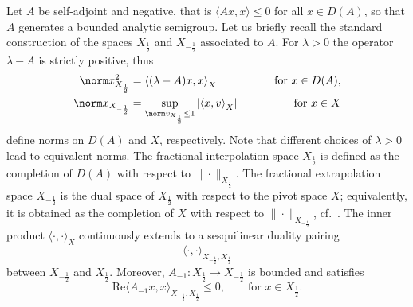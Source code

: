 \documentclass{cocv}
\renewcommand{\Re}{\mathrm{Re}}
\newcommand{\inprod}[2]{\left\langle#1,#2\right\rangle}
\theoremstyle{definition}
\begin{document}
Let $A$ be self-adjoint and negative, that is $\langle Ax,x\rangle \leq 0$ for all $x \in D(A)$, so that $A$ generates a bounded analytic semigroup. Let us briefly recall the standard construction of the spaces $X_{\frac{1}{2}}$ and $X_{-\frac{1}{2}}$ associated to $A$. For $\lambda>0$ the operator $\lambda-A$ is strictly positive, thus
\begin{equation*}
    \begin{aligned}
        \norm x^2_{X_{\frac12}} &= \inprod{(\lambda-A)x}{x}_X \qquad &\text{ for } x \in D(A),\\
        \norm x_{X_{-\frac12}} &= \sup_{\norm v_{X_{\frac12}}\le 1}\left|\inprod{x}{v}_X\right| \qquad &\text{ for } x \in X
    \end{aligned}
\end{equation*}
define norms on $D(A)$ and $X$, respectively. Note that different choices of $\lambda>0$ lead to equivalent norms.
The fractional interpolation space $X_{\frac12}$ is defined as the completion
of $D(A)$ with respect to $\|\cdot\|_{X_{\frac12}}$. The fractional
extrapolation space $X_{-\frac12}$ is the dual space of $X_{\frac12}$ with
respect to the pivot space $X$; equivalently, it is obtained as the completion
of $X$ with respect to $\|\cdot\|_{X_{-\frac12}}$, cf.~\cite[Sec.~2.10]{MR2502023}.
The inner product $\langle\cdot,\cdot\rangle_X$ continuously extends to a
sesquilinear duality pairing
\[
    \langle\cdot,\cdot\rangle_{X_{-\frac12},X_{\frac12}}
\]
between $X_{-\frac12}$ and $X_{\frac12}$. Moreover,
$A_{-1}\colon X_{\frac12}\to X_{-\frac12}$ is bounded and satisfies
\[
    \Re\langle A_{-1}x,x\rangle_{X_{-\frac12},X_{\frac12}}\le0,
    \qquad \text{for }x\in X_{\frac12}.
\]
\end{document}
